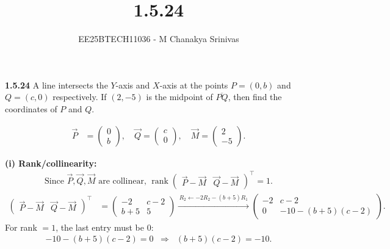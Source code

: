 \documentclass[journal]{IEEEtran}
\begin{document}
	
	
	\vspace{3cm}
	
	\title{1.5.24}
	\author{EE25BTECH11036 - M Chanakya Srinivas}
	\maketitle
	{\let\newpage\relax\maketitle}
	
	\renewcommand{\thefigure}{\theenumi}
	\renewcommand{\thetable}{\theenumi}
	\setlength{\intextsep}{10pt} %
	
	
	\renewcommand{\thetable}{\theenumi}

\textbf{1.5.24}\quad
A line intersects the $Y$-axis and $X$-axis at the points
$P=(0,b)$ and $Q=(c,0)$ respectively. If $(2,-5)$ is the midpoint of
$\overline{PQ}$, then find the coordinates of $P$ and $Q$.

\providecommand{\myvec}[1]{\begin{pmatrix}#1\end{pmatrix}}

\begin{align*}
\vec P&=\myvec{0\\ b},\quad 
\vec Q=\myvec{c\\ 0},\quad 
\vec M=\myvec{2\\ -5}.
\end{align*}

\textbf{(i) Rank/collinearity: } 
\begin{align*}
\text{Since } \vec P,\vec Q,\vec M \text{ are collinear, } 
\operatorname{rank}\myvec{\vec P-\vec M & \vec Q-\vec M}^{\top}=1.
\end{align*}
\begin{align*}
\myvec{\vec P-\vec M & \vec Q-\vec M}^{\top}
&=\myvec{-2 & c-2\\[2pt] b+5 & 5}
\xrightarrow{\,R_2\leftarrow -2R_2-(b+5)R_1\,}
\myvec{-2 & c-2\\[2pt] 0 & -10-(b+5)(c-2)}.
\end{align*}
For rank \(=1\), the last entry must be \(0\):
\begin{align*}
-10-(b+5)(c-2)=0
\;\;\Longrightarrow\;\;
(b+5)(c-2)=-10. \tag{*}
\end{align*}
\end{document}
